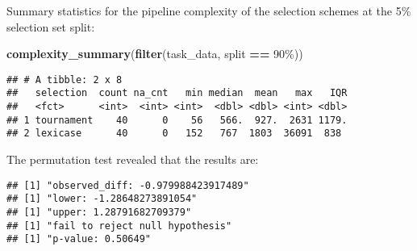 \documentclass[
]{book}
\newenvironment{Shaded}{\begin{snugshade}}{\end{snugshade}}
\newcommand{\AttributeTok}[1]{\textcolor[rgb]{0.13,0.29,0.53}{#1}}
\newcommand{\DecValTok}[1]{\textcolor[rgb]{0.00,0.00,0.81}{#1}}
\newcommand{\FunctionTok}[1]{\textcolor[rgb]{0.13,0.29,0.53}{\textbf{#1}}}
\newcommand{\NormalTok}[1]{#1}
\newcommand{\OtherTok}[1]{\textcolor[rgb]{0.56,0.35,0.01}{#1}}
\newcommand{\SpecialCharTok}[1]{\textcolor[rgb]{0.81,0.36,0.00}{\textbf{#1}}}
\newcommand{\StringTok}[1]{\textcolor[rgb]{0.31,0.60,0.02}{#1}}
\begin{document}
Summary statistics for the pipeline complexity of the selection schemes at the 5\% selection set split:

\begin{Shaded}
\begin{Highlighting}[]
\FunctionTok{complexity\_summary}\NormalTok{(}\FunctionTok{filter}\NormalTok{(task\_data, split }\SpecialCharTok{==} \StringTok{\textquotesingle{}90\%\textquotesingle{}}\NormalTok{))}
\end{Highlighting}
\end{Shaded}

\begin{verbatim}
## # A tibble: 2 x 8
##   selection  count na_cnt   min median  mean   max   IQR
##   <fct>      <int>  <int> <int>  <dbl> <dbl> <int> <dbl>
## 1 tournament    40      0    56   566.  927.  2631 1179.
## 2 lexicase      40      0   152   767  1803  36091  838
\end{verbatim}

The permutation test revealed that the results are:

\begin{Shaded}
\end{Shaded}

\begin{verbatim}
## [1] "observed_diff: -0.979988423917489"
## [1] "lower: -1.28648273891054"
## [1] "upper: 1.28791682709379"
## [1] "fail to reject null hypothesis"
## [1] "p-value: 0.50649"
\end{verbatim}
\end{document}
